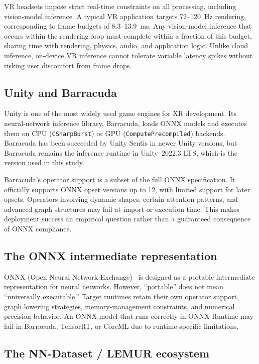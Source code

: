 \documentclass[10pt,twocolumn,letterpaper]{article}
\begin{document}
VR headsets impose strict real-time constraints on all processing, including vision-model inference. A typical VR application targets 72--120~Hz rendering, corresponding to frame budgets of 8.3--13.9~ms. Any vision-model inference that occurs within the rendering loop must complete within a fraction of this budget, sharing time with rendering, physics, audio, and application logic. Unlike cloud inference, on-device VR inference cannot tolerate variable latency spikes without risking user discomfort from frame drops.

\subsection{Unity and Barracuda}

Unity is one of the most widely used game engines for XR development. Its neural-network inference library, Barracuda, loads ONNX models and executes them on CPU (\texttt{CSharpBurst}) or GPU (\texttt{ComputePrecompiled}) backends. Barracuda has been succeeded by Unity Sentis in newer Unity versions, but Barracuda remains the inference runtime in Unity~2022.3 LTS, which is the version used in this study.

Barracuda's operator support is a subset of the full ONNX specification. It officially supports ONNX opset versions up to 12, with limited support for later opsets. Operators involving dynamic shapes, certain attention patterns, and advanced graph structures may fail at import or execution time. This makes deployment success an empirical question rather than a guaranteed consequence of ONNX compliance.

\subsection{The ONNX intermediate representation}

ONNX (Open Neural Network Exchange)~\cite{onnx2019} is designed as a portable intermediate representation for neural networks. However, ``portable'' does not mean ``universally executable.'' Target runtimes retain their own operator support, graph lowering strategies, memory-management constraints, and numerical precision behavior. An ONNX model that runs correctly in ONNX Runtime may fail in Barracuda, TensorRT, or CoreML due to runtime-specific limitations.

\subsection{The NN-Dataset / LEMUR ecosystem}
\end{document}
